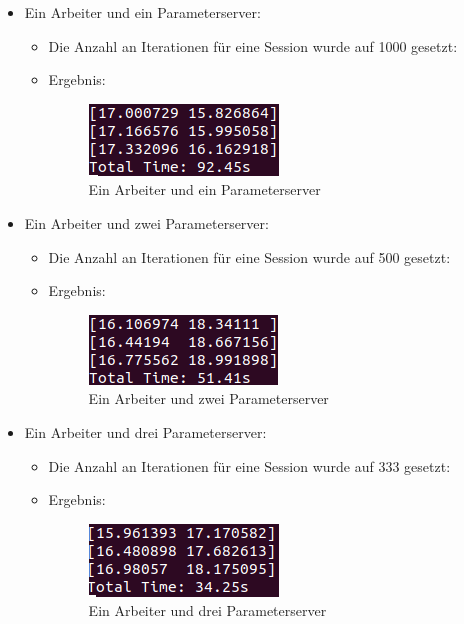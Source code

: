 \begin{itemize}
	\item Ein Arbeiter und ein Parameterserver:
	\begin{itemize}
		\item Die Anzahl an Iterationen für eine Session wurde auf 1000 gesetzt:
		\item Ergebnis:
			\begin{figure}[!h]
				\centering
				\includegraphics[width=0.5\linewidth]{Pictures/1worker1ps}
				\caption{Ein Arbeiter und ein Parameterserver}
				\label{fig:1worker1ps}
			\end{figure}
	\end{itemize}
	\item Ein Arbeiter und zwei Parameterserver:
	\begin{itemize}
		\item Die Anzahl an Iterationen für eine Session wurde auf 500 gesetzt:
		\item Ergebnis:
			\begin{figure}[!h]
				\centering
				\includegraphics[width=0.5\linewidth]{Pictures/2worker1ps}
				\caption{Ein Arbeiter und zwei Parameterserver}
				\label{fig:2worker1ps}
			\end{figure}
	\end{itemize}
	\item Ein Arbeiter und drei Parameterserver:
	\begin{itemize}
		\item Die Anzahl an Iterationen für eine Session wurde auf 333 gesetzt:
		\item Ergebnis:
			\begin{figure}[!h]
				\centering
				\includegraphics[width=0.5\linewidth]{Pictures/3worker1ps}
				\caption{Ein Arbeiter und drei Parameterserver}
				\label{fig:3worker1ps}
			\end{figure}			
	\end{itemize}
\end{itemize}

